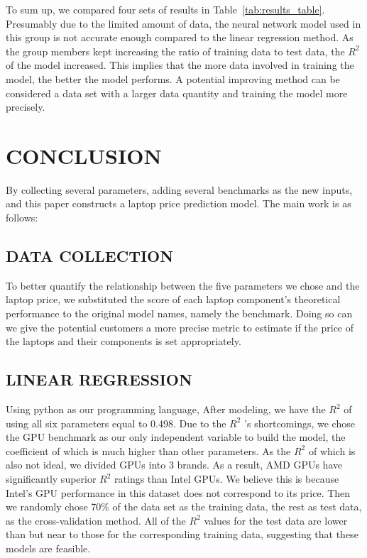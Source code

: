 \documentclass{scrartcl}
\begin{document}
\noindent To sum up, we compared four sets of results in Table~\ref{tab:results_table}. Presumably due to the limited amount of data, the neural network model used in this group is not accurate enough compared to the linear regression method. As the group members kept increasing the ratio of training data to test data, the $R^2$ of the model increased. This implies that the more data involved in training the model, the better the model performs. A potential improving method can be considered a data set with a larger data quantity and training the model more precisely.\\




\section{CONCLUSION}




By collecting several parameters, adding several benchmarks as the new inputs, and this paper constructs a laptop price prediction model. The main work is as follows:\\

\subsection{DATA COLLECTION}
To better quantify the relationship between the five parameters we chose and the laptop price, we substituted the score of each laptop component’s theoretical performance to the original model names, namely the benchmark. Doing so can we give the potential customers a more precise metric to estimate if the price of the laptops and their components is set appropriately.\\
\subsection{LINEAR REGRESSION}
Using python as our programming language, After modeling, we have the $R^2$ of using all six parameters equal to 0.498. Due to the $R^2$ 's shortcomings, we chose the GPU benchmark as our only independent variable to build the model, the coefficient of which is much higher than other parameters. As the $R^2$ of which is also not ideal, we divided GPUs into 3 brands. As a result, AMD GPUs have significantly superior $R^2$ ratings than Intel GPUs. We believe this is because Intel's GPU performance in this dataset does not correspond to its price. Then we randomly chose 70\% of the data set as the training data, the rest as test data, as the cross-validation method. All of the $R^2$ values for the test data are lower than but near to those for the corresponding training data, suggesting that these models are feasible.\\
\end{document}
